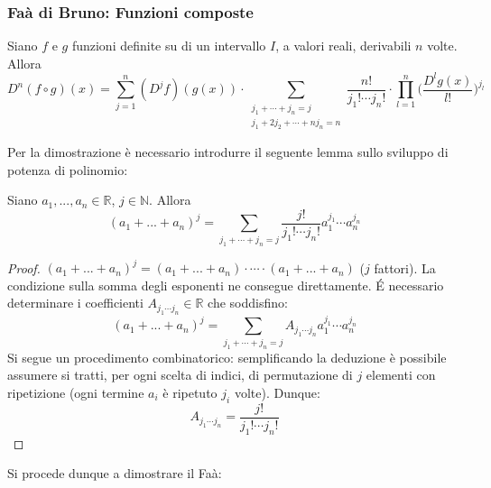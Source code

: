 \documentclass[10pt, oneside]{book}
\theoremstyle{plain}
\begin{document}
\subsubsection{Faà di Bruno: Funzioni composte}
\begin{ther}
    Siano $f$ e $g$ funzioni definite su di un intervallo $I$, a valori reali, derivabili $n$ volte. Allora
    \[D^n(f\circ g)(x) = \sum \limits_{j = 1}^{n} (D^jf)(g(x)) \cdot \sum_{\substack{j_1 + \cdots + j_n = j \\ j_1 + 2 j_2 + \cdots + n j_n = n}} \frac{n!}{j_1! \cdots j_n!} \cdot \prod\limits_{l=1}^n\bigg(\frac{D^lg(x)}{l!}\bigg)^{j_l}\]
\end{ther}
Per la dimostrazione è necessario introdurre il seguente lemma sullo sviluppo di potenza di polinomio: 
\begin{lem}
Siano $a_1, ..., a_n \in \mathbb{R}$, $j \in \mathbb{N}$. Allora
\[(a_1 + ... + a_n)^j = \sum \limits_{j_1 + \cdots + j_n = j} \frac{j!}{j_1! \cdots j_n!}a_1^{j_1} \cdots a_n^{j_n}\]
\end{lem}
\begin{proof}
    $(a_1 + ... + a_n)^j = (a_1 + ... + a_n) \cdot \cdots \cdot (a_1 + ... + a_n)$ ($j$ fattori). La condizione sulla somma degli esponenti ne consegue direttamente. \'E necessario determinare i coefficienti $A_{j_1 \cdots j_n} \in \mathbb{R}$ che soddisfino:
    \[(a_1 + ... + a_n)^j = \sum \limits_{j_1 + \cdots + j_n = j} A_{j_1 \cdots j_n} a_1^{j_1} \cdots a_n^{j_n}\]
    Si segue un procedimento combinatorico: semplificando la deduzione è possibile assumere si tratti, per ogni scelta di indici, di permutazione di $j$ elementi con ripetizione (ogni termine $a_i$ è ripetuto $j_i$ volte). Dunque:
    \[A_{j_1 \cdots j_n} = \frac{j!}{j_1! \cdots j_n!}\]
\end{proof}
Si procede dunque a dimostrare il Faà:
\end{document}
